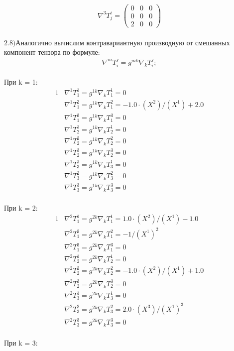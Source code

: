 \documentclass[a4paper, 12pt, oneside]{article}
\begin{document}
\[
\nabla^3T^i_j = \begin{pmatrix}
	0 & 0 & 0\\
	0 & 0 & 0\\
	2 & 0 & 0
\end{pmatrix}
\]\\
$\mathrm{2.8) }$Аналогично вычислим контравариантную производную от смешанных компонент тензора по формуле:\\
\[
\nabla^mT^j_i = g^{mk}\nabla_kT^j_i;
\]\\
При k = 1:\\
\begin{alignat*}{1}
  & \nabla^1T^1_1 = g^{1k}\nabla_kT^1_1 = 0 \\
  & \nabla^1T^2_1 = g^{1k}\nabla_kT^2_1 = -1.0\cdot (X^2)/(X^1) + 2.0 \\
  & \nabla^1T^3_1 = g^{1k}\nabla_kT^3_1 = 0 \\
  & \nabla^1T^1_2 = g^{1k}\nabla_kT^1_2 = 0 \\
  & \nabla^1T^2_2 = g^{1k}\nabla_kT^2_2 = 0 \\
  & \nabla^1T^3_2 = g^{1k}\nabla_kT^3_2 = 0 \\
  & \nabla^1T^1_3 = g^{1k}\nabla_kT^1_3 = 0 \\
  & \nabla^1T^2_3 = g^{1k}\nabla_kT^2_3 = 0 \\
  & \nabla^1T^3_3 = g^{1k}\nabla_kT^3_3 = 0 
\end{alignat*}\\
При k = 2:\\
\begin{alignat*}{1}
  & \nabla^2T^1_1 = g^{2k}\nabla_kT^1_1 = 1.0\cdot (X^2)/(X^1) - 1.0 \\
  & \nabla^2T^2_1 = g^{2k}\nabla_kT^2_1 = -1/(X^1)^2 \\
  & \nabla^2T^3_1 = g^{2k}\nabla_kT^3_1 = 0 \\
  & \nabla^2T^1_2 = g^{2k}\nabla_kT^1_2 = 0 \\
  & \nabla^2T^2_2 = g^{2k}\nabla_kT^2_2 = -1.0\cdot (X^2)/(X^1) + 1.0 \\
  & \nabla^2T^3_2 = g^{2k}\nabla_kT^3_2 = 0 \\
  & \nabla^2T^1_3 = g^{2k}\nabla_kT^1_3 = 0 \\
  & \nabla^2T^2_3 = g^{2k}\nabla_kT^2_3 = 2.0\cdot (X^3)/(X^1)^3 \\
  & \nabla^2T^3_3 = g^{2k}\nabla_kT^3_3 = 0 
\end{alignat*}\\
При k = 3:\\
\end{document}
